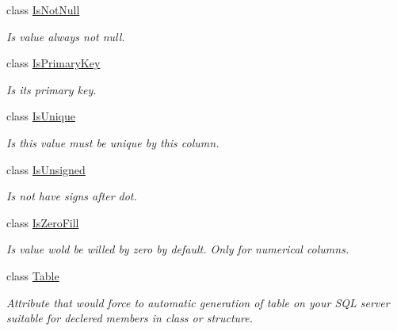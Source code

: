 \begin{DoxyCompactItemize}
class \mbox{\hyperlink{class_uniform_data_operator_1_1_sql_1_1_attributes_1_1_is_not_null}{Is\+Not\+Null}}
\begin{DoxyCompactList}\small\item\em Is value always not null. \end{DoxyCompactList}\item 
class \mbox{\hyperlink{class_uniform_data_operator_1_1_sql_1_1_attributes_1_1_is_primary_key}{Is\+Primary\+Key}}
\begin{DoxyCompactList}\small\item\em Is it\textquotesingle{}s primary key. \end{DoxyCompactList}\item 
class \mbox{\hyperlink{class_uniform_data_operator_1_1_sql_1_1_attributes_1_1_is_unique}{Is\+Unique}}
\begin{DoxyCompactList}\small\item\em Is this value must be unique by this column. \end{DoxyCompactList}\item 
class \mbox{\hyperlink{class_uniform_data_operator_1_1_sql_1_1_attributes_1_1_is_unsigned}{Is\+Unsigned}}
\begin{DoxyCompactList}\small\item\em Is not have signs after dot. \end{DoxyCompactList}\item 
class \mbox{\hyperlink{class_uniform_data_operator_1_1_sql_1_1_attributes_1_1_is_zero_fill}{Is\+Zero\+Fill}}
\begin{DoxyCompactList}\small\item\em Is value wold be willed by zero by default. Only for numerical columns. \end{DoxyCompactList}\item 
class \mbox{\hyperlink{class_uniform_data_operator_1_1_sql_1_1_attributes_1_1_table}{Table}}
\begin{DoxyCompactList}\small\item\em Attribute that would force to automatic generation of table on your S\+QL server suitable for declered members in class or structure. \end{DoxyCompactList}\end{DoxyCompactItemize}
